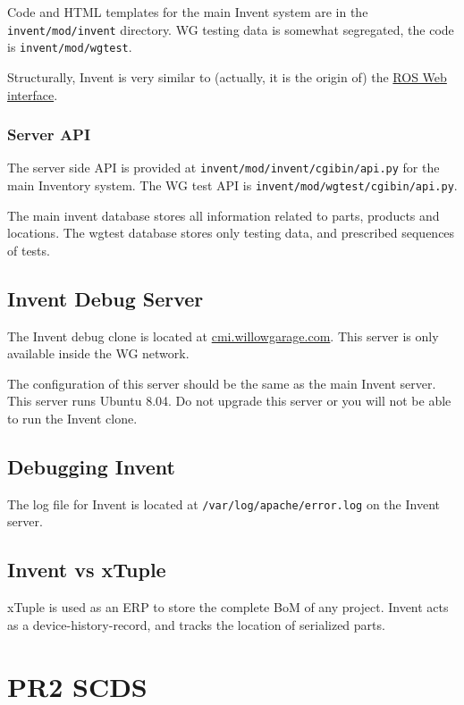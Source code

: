 \documentclass[11pt]{report}
\begin{document}
Code and HTML templates for the main Invent system are in the \texttt{invent/mod/invent} directory. WG testing data is somewhat segregated, the code is \texttt{invent/mod/wgtest}.

Structurally, Invent is very similar to (actually, it is the origin of) the \href{http://www.ros.org/wiki/web\_interface}{ROS Web interface}. 

\subsection{Server API}

The server side API is provided at \texttt{invent/mod/invent/cgibin/api.py} for the main Inventory system. The WG test API is  \texttt{invent/mod/wgtest/cgibin/api.py}.

The main invent database stores all information related to parts, products and locations. The wgtest database stores only testing data, and prescribed sequences of tests. 



\section {Invent Debug Server}

The Invent debug clone is located at \href{http://cmi.willowgarage.com}{cmi.willowgarage.com}. This server is only available inside the WG network.

The configuration of this server should be the same as the main Invent server. This server runs Ubuntu 8.04. Do not upgrade this server or you will not be able to run the Invent clone.

\section{Debugging Invent}

The log file for Invent is located at \texttt{/var/log/apache/error.log} on the Invent server. 

\section{Invent vs xTuple}

xTuple is used as an ERP to store the complete BoM of any project. Invent acts as a device-history-record, and tracks the location of serialized parts.

\chapter {PR2 SCDS}
\end{document}
